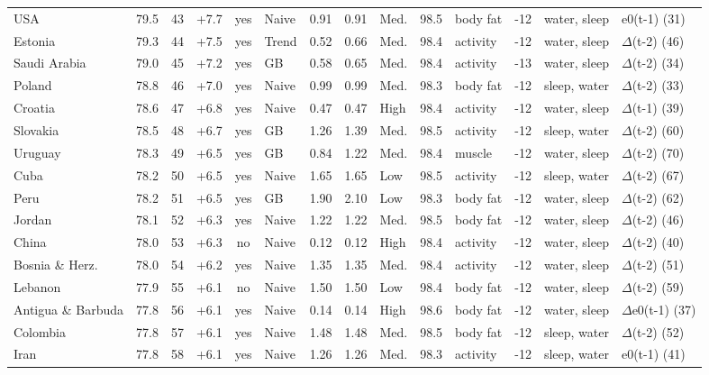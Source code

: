 {\begin{longtable}{l r r r c l r r l r l r l l}
USA & 79.5 & 43 & +7.7 & yes & Naive & 0.91 & 0.91 & Med. & 98.5 & body fat & -12 & water, sleep & e0(t-1) (31) \\
Estonia & 79.3 & 44 & +7.5 & yes & Trend & 0.52 & 0.66 & Med. & 98.4 & activity & -12 & water, sleep & $\Delta$(t-2) (46) \\
Saudi Arabia & 79.0 & 45 & +7.2 & yes & GB & 0.58 & 0.65 & Med. & 98.4 & activity & -13 & water, sleep & $\Delta$(t-2) (34) \\
Poland & 78.8 & 46 & +7.0 & yes & Naive & 0.99 & 0.99 & Med. & 98.3 & body fat & -12 & sleep, water & $\Delta$(t-2) (33) \\
Croatia & 78.6 & 47 & +6.8 & yes & Naive & 0.47 & 0.47 & High & 98.4 & activity & -12 & water, sleep & $\Delta$(t-1) (39) \\
Slovakia & 78.5 & 48 & +6.7 & yes & GB & 1.26 & 1.39 & Med. & 98.5 & activity & -12 & sleep, water & $\Delta$(t-2) (60) \\
Uruguay & 78.3 & 49 & +6.5 & yes & GB & 0.84 & 1.22 & Med. & 98.4 & muscle & -12 & water, sleep & $\Delta$(t-2) (70) \\
Cuba & 78.2 & 50 & +6.5 & yes & Naive & 1.65 & 1.65 & Low & 98.5 & activity & -12 & sleep, water & $\Delta$(t-2) (67) \\
Peru & 78.2 & 51 & +6.5 & yes & GB & 1.90 & 2.10 & Low & 98.3 & body fat & -12 & water, sleep & $\Delta$(t-2) (62) \\
Jordan & 78.1 & 52 & +6.3 & yes & Naive & 1.22 & 1.22 & Med. & 98.5 & body fat & -12 & water, sleep & $\Delta$(t-2) (46) \\
China & 78.0 & 53 & +6.3 & no & Naive & 0.12 & 0.12 & High & 98.4 & activity & -12 & water, sleep & $\Delta$(t-2) (40) \\
Bosnia \& Herz. & 78.0 & 54 & +6.2 & yes & Naive & 1.35 & 1.35 & Med. & 98.4 & activity & -12 & water, sleep & $\Delta$(t-2) (51) \\
Lebanon & 77.9 & 55 & +6.1 & no & Naive & 1.50 & 1.50 & Low & 98.4 & body fat & -12 & water, sleep & $\Delta$(t-2) (59) \\
Antigua \& Barbuda & 77.8 & 56 & +6.1 & yes & Naive & 0.14 & 0.14 & High & 98.6 & body fat & -12 & water, sleep & $\Delta$e0(t-1) (37) \\
Colombia & 77.8 & 57 & +6.1 & yes & Naive & 1.48 & 1.48 & Med. & 98.5 & body fat & -12 & sleep, water & $\Delta$(t-2) (52) \\
Iran & 77.8 & 58 & +6.1 & yes & Naive & 1.26 & 1.26 & Med. & 98.3 & activity & -12 & sleep, water & e0(t-1) (41) \\

\end{longtable}}
